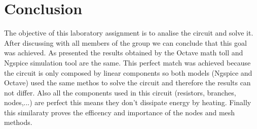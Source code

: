 \section{Conclusion}
\label{sec:conclusion}


The objective of this laboratory assignment is to analise the circuit and solve it. After discussing with all members of the group we can conclude that this goal was achieved.
As presented the results obtained by the Octave math toll and Ngspice simulation tool are the same. This perfect match was achieved because the circuit is only composed by linear components so both models (Ngspice and Octave) used the same methos to solve the circuit and therefore the results can not differ.
Also all the components used in this circuit (resistors, branches, nodes,...) are perfect this means they don't dissipate energy by heating.
Finally this similaraty proves the efficency and importance of the nodes and mesh methods.
